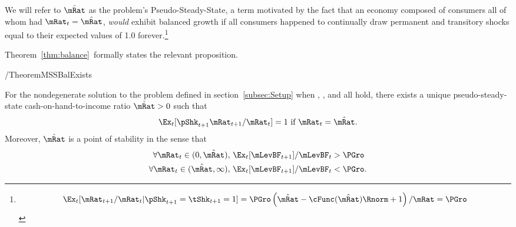 \documentclass[BufferStockTheory]{subfiles}
\begin{document}
  We will refer to $\hat{\mRat}$ as the problem's Pseudo-Steady-State, a term motivated by the fact that an economy composed of consumers all of whom had $\mRat_{t}=\hat{\mRat}$, \textit{would} exhibit balanced growth if all consumers happened to continually draw permanent and transitory shocks equal to their expected values of 1.0 forever.\footnote{    \begin{align*}
      \Ex_{t}[\mRat_{t+1}/\mRat_{t}|\pShk_{t+1}=\tShk_{t+1}=1] = \PGro \left(\hat{\mRat}-\cFunc(\hat{\mRat})\Rnorm + 1 \right)/\mRat = \PGro
    \end{align*}
}



Theorem~\ref{thm:balance}~formally states the relevant proposition.
  \begin{verbatimwrite}{\EqDir/TheoremMSSBalExists}
\begin{theorem}  \label{thm:balance} \label{thm:MSSBalExists}
 For the nondegenerate solution to the problem defined in section~\ref{subsec:Setup} when {\FVAC}, {\WRIC}, and {\GIC} all hold, there exists a unique pseudo-steady-state cash-on-hand-to-income ratio $\mBal>0$ such that
  \begin{equation}  
    \Ex_t [\pShk_{t+1}{\mRat}_{t+1}/\mRat_t] = 1 \mbox{~if~} \mRat_t = \mBal. 
    \label{eq:mTarget}
  \end{equation}
  Moreover, $\mBal$ is a point of stability in the sense that
  \begin{align}\label{eq:stability}
    \forall {\mRat}_t\in(0,\mBal),      \,\,& \Ex_{t}[\mLevBF_{t+1}]/\mLevBF_{t} > \PGro \\
    \forall {\mRat}_t\in(\mBal,\infty), \,\,& \Ex_{t}[\mLevBF_{t+1}]/\mLevBF_{t} < \PGro. \notag
  \end{align}
\end{theorem}
\end{verbatimwrite}


\end{document}
